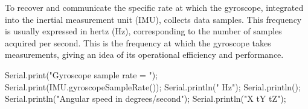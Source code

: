To recover and communicate the specific rate at which the gyroscope, integrated into the inertial measurement unit (IMU), collects data samples. This frequency is usually expressed in hertz (Hz), corresponding to the number of samples acquired per second. This is the frequency at which the gyroscope takes measurements, giving an idea of its operational efficiency and performance.

\begin{Arduino}
    Serial.print("Gyroscope sample rate = ");
    Serial.print(IMU.gyroscopeSampleRate());
    Serial.println(" Hz");
    Serial.println();
    Serial.println("Angular speed in degrees/second");
    Serial.println("X tY tZ");
    
\end{Arduino}


